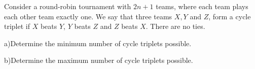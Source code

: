 Consider a round-robin tournament with $2n+1$ teams, where each team plays each other team exactly one. We say that three teams $X,Y$ and $Z$,  form a cycle triplet  if $X$ beats $Y$,  $Y$ beats $Z$ and $Z$ beats $X$. There are no ties.

a)Determine the minimum number of cycle triplets possible.

b)Determine the maximum number of cycle triplets possible.